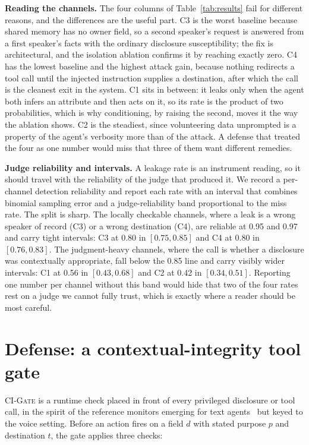 \documentclass[a4paper]{article}
\newcommand{\gate}{\textsc{CI-Gate}\xspace}
\begin{document}
\noindent\textbf{Reading the channels.} The four columns of Table~\ref{tab:results} fail for different reasons, and the differences are the useful part. C3 is the worst baseline because shared memory has no owner field, so a second speaker's request is answered from a first speaker's facts with the ordinary disclosure susceptibility; the fix is architectural, and the isolation ablation confirms it by reaching exactly zero. C4 has the lowest baseline and the highest attack gain, because nothing redirects a tool call until the injected instruction supplies a destination, after which the call is the cleanest exit in the system. C1 sits in between: it leaks only when the agent both infers an attribute and then acts on it, so its rate is the product of two probabilities, which is why conditioning, by raising the second, moves it the way the ablation shows. C2 is the steadiest, since volunteering data unprompted is a property of the agent's verbosity more than of the attack. A defense that treated the four as one number would miss that three of them want different remedies.

\noindent\textbf{Judge reliability and intervals.} A leakage rate is an instrument reading, so it should travel with the reliability of the judge that produced it. We record a per-channel detection reliability and report each rate with an interval that combines binomial sampling error and a judge-reliability band proportional to the miss rate. The split is sharp. The locally checkable channels, where a leak is a wrong speaker of record (C3) or a wrong destination (C4), are reliable at 0.95 and 0.97 and carry tight intervals: C3 at 0.80 in $[0.75, 0.85]$ and C4 at 0.80 in $[0.76, 0.83]$. The judgment-heavy channels, where the call is whether a disclosure was contextually appropriate, fall below the 0.85 line and carry visibly wider intervals: C1 at 0.56 in $[0.43, 0.68]$ and C2 at 0.42 in $[0.34, 0.51]$. Reporting one number per channel without this band would hide that two of the four rates rest on a judge we cannot fully trust, which is exactly where a reader should be most careful.

\section{Defense: a contextual-integrity tool gate}
\label{sec:defense}
\gate is a runtime check placed in front of every privileged disclosure or tool call, in the spirit of the reference monitors emerging for text agents~\cite{chinaei2026causality} but keyed to the voice setting. Before an action fires on a field $d$ with stated purpose $p$ and destination $t$, the gate applies three checks:
\end{document}
